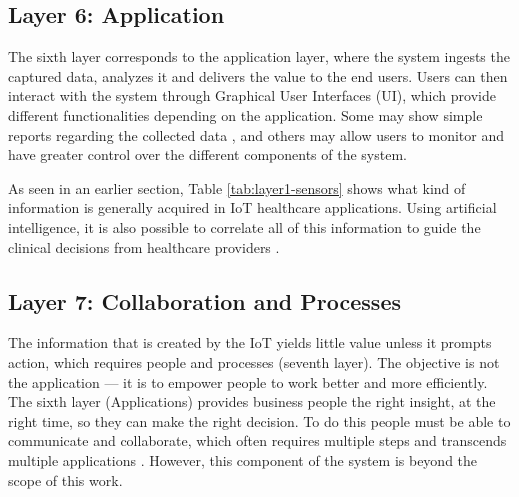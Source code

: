 
\subsection{Layer 6: Application}
\label{sec:iot-model-layer6}

The sixth layer corresponds to the application layer, where the system ingests the captured data, analyzes it and delivers the value to the end users. Users can then interact with the system through Graphical User Interfaces (UI), which provide different functionalities depending on the application. Some may show simple reports regarding the collected data \cite{Doukas2012, Wu2020}, and others may allow users to monitor and have greater control over the different components of the system. \bigskip

As seen in an earlier section, Table \ref{tab:layer1-sensors} shows what kind of information is generally acquired in \acs{IoT} healthcare applications. Using artificial intelligence, it is also possible to correlate all of this information to guide the clinical decisions from healthcare providers \cite{Gruendner2019, Wagholikar2017, BrainAnswer}. \bigskip

\subsection{Layer 7: Collaboration and Processes}
\label{sec:iot-model-layer7}



The information that is created by the \acs{IoT} yields little value unless it prompts action, which requires people and processes (seventh layer). The objective is not the application — it is to empower people to work better and more efficiently. The sixth layer (Applications) provides business people the right insight, at the right time, so they can make the right decision. To do this people must be able to communicate and collaborate, which often requires multiple steps and transcends multiple applications \cite{Cisco2014}. However, this component of the system is beyond the scope of this work.


